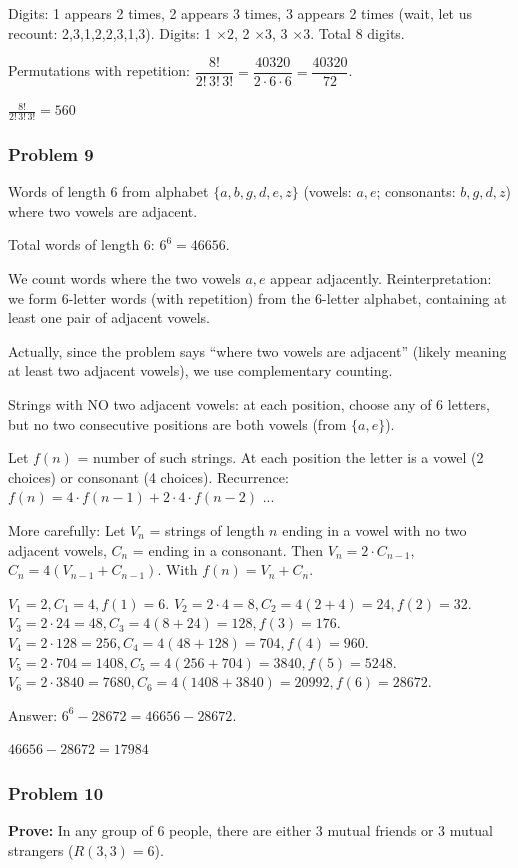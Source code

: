 Digits: 1 appears 2 times, 2 appears 3 times, 3 appears 2 times (wait, let us recount: 2,3,1,2,2,3,1,3).
Digits: 1 $\times 2$, 2 $\times 3$, 3 $\times 3$. Total 8 digits.

Permutations with repetition: $\dfrac{8!}{2!\,3!\,3!} = \dfrac{40320}{2\cdot6\cdot6} = \dfrac{40320}{72}$.

$\boxed{\frac{8!}{2!\,3!\,3!} = 560}$

\subsubsection*{Problem 9}
Words of length 6 from alphabet $\{a, b, g, d, e, z\}$ (vowels: $a, e$; consonants: $b, g, d, z$) where two vowels are adjacent.

Total words of length 6: $6^6 = 46656$.

We count words where the two vowels $a, e$ appear adjacently. Reinterpretation: we form 6-letter words (with repetition) from the 6-letter alphabet, containing at least one pair of adjacent vowels.

Actually, since the problem says ``where two vowels are adjacent'' (likely meaning at least two adjacent vowels), we use complementary counting.

Strings with NO two adjacent vowels: at each position, choose any of 6 letters, but no two consecutive positions are both vowels (from $\{a,e\}$).

Let $f(n)$ = number of such strings. At each position the letter is a vowel (2 choices) or consonant (4 choices).
Recurrence: $f(n) = 4\cdot f(n-1) + 2\cdot 4\cdot f(n-2)$ ...

More carefully: Let $V_n$ = strings of length $n$ ending in a vowel with no two adjacent vowels, $C_n$ = ending in a consonant. Then $V_n = 2\cdot C_{n-1}$, $C_n = 4(V_{n-1}+C_{n-1})$. With $f(n)=V_n+C_n$.

$V_1=2, C_1=4, f(1)=6$.
$V_2=2\cdot4=8, C_2=4(2+4)=24, f(2)=32$.
$V_3=2\cdot24=48, C_3=4(8+24)=128, f(3)=176$.
$V_4=2\cdot128=256, C_4=4(48+128)=704, f(4)=960$.
$V_5=2\cdot704=1408, C_5=4(256+704)=3840, f(5)=5248$.
$V_6=2\cdot3840=7680, C_6=4(1408+3840)=20992, f(6)=28672$.

Answer: $6^6 - 28672 = 46656 - 28672$.

$\boxed{46656 - 28672 = 17984}$

\subsubsection*{Problem 10}
\textbf{Prove:} In any group of 6 people, there are either 3 mutual friends or 3 mutual strangers ($R(3,3)=6$).


